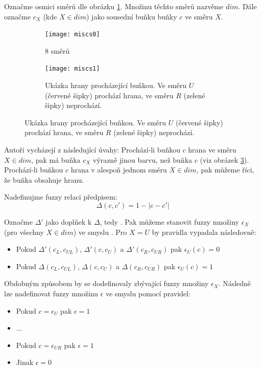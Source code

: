 \documentclass[a4paper,10pt]{article}
\begin{document}
Označme osmici směrů dle obrázku \ref{img:Directions:8Directions}. Množinu těchto směrů nazvěme $dim$. Dále označme $c_X$ (kde $X \in dim$) jako sousední buňku buňky $c$ ve směru $X$.

\begin{figure}
   \begin{subfigure}[t]{0.4\textwidth}
      \texttt{[image: miscs0]}
      \caption{8 směrů}  \label{img:Directions:8Directions}
    \end{subfigure}%
%
    \begin{subfigure}[t]{0.4\textwidth}
      \texttt{[image: miscs1]}
      \caption{Ukázka hrany procházející buňkou. Ve směru $U$ (červené šipky) prochází hrana, ve směru $R$ (zelené šipky) neprochází.}  \label{img:Directions:Edges}
    \end{subfigure}
\end{figure}

Autoři vycházejí z následující úvahy: Prochází-li buňkou $c$ hrana ve směru $X \in dim$, pak má buňka $c_X$ výrazně jinou barvu, než buňka $c$ (viz obrázek \ref{img:Directions:Edges}). Prochází-li buňkou $c$ hrana v alespoň jednom směru $X \in dim$, pak můžeme říci, že buňka obsahuje hranu.

Nadefinujme fuzzy relaci  předpisem:
$$
  \Delta(c, c') = 1 - | c - c' |
$$

Označme $\Delta'$ jako doplňek k $\Delta$, tedy . Pak můžeme stanovit fuzzy množiny $\epsilon_X$ (pro všechny $X \in dim$) ve smyslu . Pro $X = U$ by pravidla vypadala následovně:
\begin{itemize}
 \item Pokud $\Delta'(c_{L}, c_{UL})$, $\Delta'(c, c_{U})$ a $\Delta'(c_{R}, c_{UR})$ pak $\epsilon_U(c) = 0$
 \item Pokud $\Delta (c_{L}, c_{UL})$, $\Delta (c, c_{U})$ a $\Delta (c_{R}, c_{UR})$ pak $\epsilon_U(c) = 1$
\end{itemize}

Obdobným způsobem by se dodefinovaly zbývající fuzzy množiny $\epsilon_X$. Následně lze nadefinovat fuzzy množinu $\epsilon$ ve smyslu  pomocí pravidel:
\begin{itemize}
 \item Pokud $c = \epsilon_{U}$ pak $\epsilon = 1$
 \item $\dots$
 \item Pokud $c = \epsilon_{UR}$ pak $\epsilon = 1$
 \item Jinak $\epsilon = 0$
\end{itemize}
\end{document}
